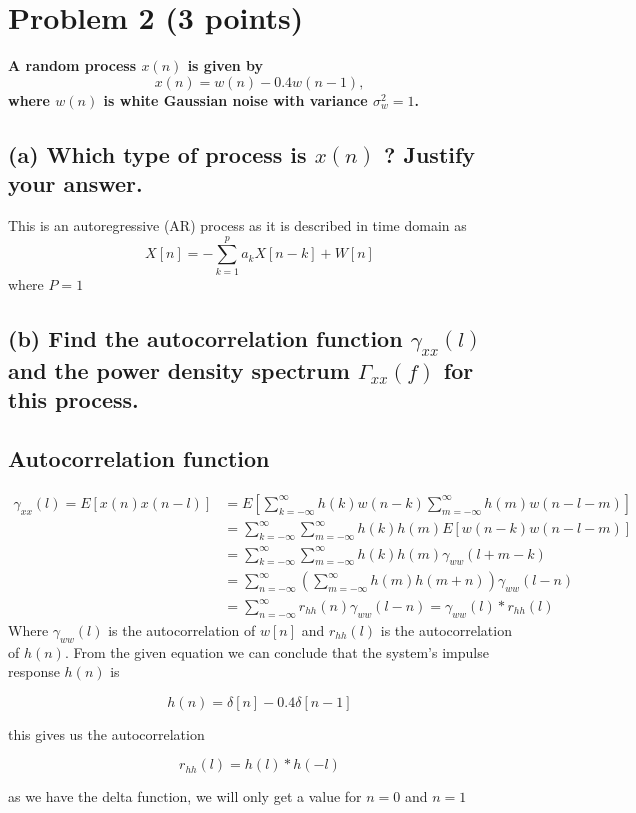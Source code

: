 \section{Problem 2 (3 points)}
\textbf{A random process $x(n)$ is given by}
$$
x(n)=w(n)-0.4 w(n-1),
$$
\textbf{where $w(n)$ is white Gaussian noise with variance $\sigma_w^2=1$.}
\subsection*{(a) Which type of process is $x(n)$ ? Justify your answer.}

This is an autoregressive (AR) process as it is described in time domain as
$$
X[n]=-\sum_{k=1}^p a_k X[n-k]+W[n]
$$
where $P=1$
\subsection*{(b) Find the autocorrelation function $\gamma_{x x}(l)$ and the power density spectrum $\Gamma_{x x}(f)$ for this process.}
\subsection*{Autocorrelation function}

$$
\begin{aligned}
\gamma_{x x}(l)  =E[x(n) x(n-l)] & =E\left[\sum_{k=-\infty}^{\infty} h(k) w(n-k) \sum_{m=-\infty}^{\infty} h(m) w(n-l-m)\right] \\
& =\sum_{k=-\infty}^{\infty} \sum_{m=-\infty}^{\infty} h(k) h(m) E[w(n-k) w(n-l-m)] \\
& =\sum_{k=-\infty}^{\infty} \sum_{m=-\infty}^{\infty} h(k) h(m) \gamma_{w w}(l+m-k) \\
& =\sum_{n=-\infty}^{\infty}\left(\sum_{m=-\infty}^{\infty} h(m) h(m+n)\right) \gamma_{w w}(l-n) \\
& =\sum_{n=-\infty}^{\infty} r_{h h}(n) \gamma_{w w}(l-n)=\gamma_{w w}(l) * r_{h h}(l)
\end{aligned}
$$
Where  $\gamma_{w w}(l)$ is the autocorrelation of $w[n]$ and $r_{h h}(l)$ is the autocorrelation of $h(n)$. From the given equation we can conclude that the system's impulse response $h(n)$ is

$$h(n)=\delta[n]-0.4\delta[n-1]$$

this gives us the autocorrelation 

$$r_{hh}(l)=h(l)*h(-l)$$

as we have the delta function, we will only get a value for $n=0$ and $n=1$


